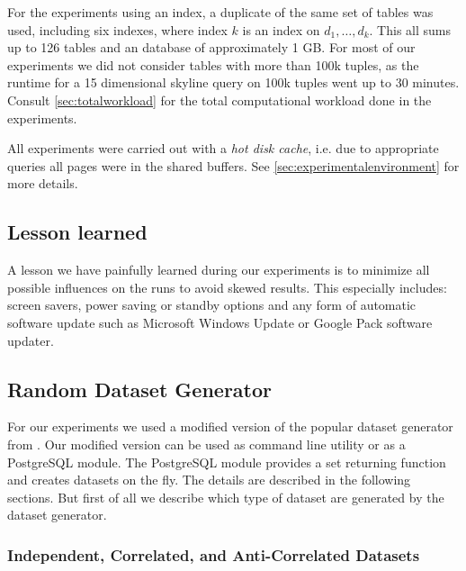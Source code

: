 For the experiments using an index, a duplicate of the same set of
tables was used, including six indexes, where index $k$ is an index on
$d_1, \ldots, d_k$.  This all sums up to 126 tables and an database of
approximately 1 GB.  For most of our experiments we did not consider
tables with more than 100k tuples, as the runtime for a 15 dimensional
skyline query on 100k tuples went up to 30 minutes. Consult
\autoref{sec:totalworkload} for the total computational workload
done in the experiments.


All experiments were carried out with a \emph{hot disk cache},
i.e. due to appropriate queries all pages were in the shared
buffers. See \autoref{sec:experimentalenvironment} for more
details.


\subsection{Lesson learned}
\label{sec:lessonlearned}
A lesson we have painfully learned during our experiments is to
minimize all possible influences on the runs to avoid skewed
results. This especially includes: screen savers, power saving or
standby options and any form of automatic software update such as
Microsoft Windows Update or Google Pack software updater.

\subsection{Random Dataset Generator}

For our experiments we used a modified version \citep{Eder2007a} of
the popular dataset generator from \citep{Borzsonyi2001}.  Our
modified version can be used as command line utility or as a
PostgreSQL module. The PostgreSQL module provides a set returning
function and creates datasets on the fly.  The details are described
in the following sections.  But first of all we describe which type of
dataset are generated by the dataset generator.

\subsubsection{Independent, Correlated, and Anti-Correlated Datasets}
\label{sec:corr-anti-indep}

